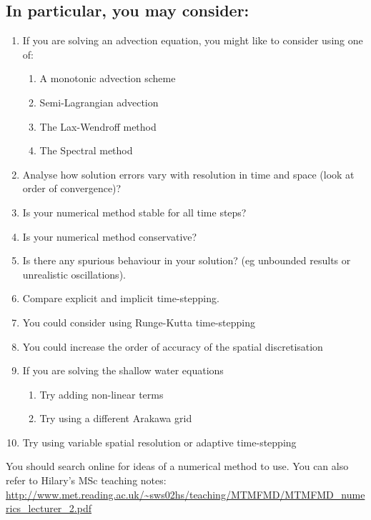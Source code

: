 \subsection*{In particular, you may consider:}
\begin{enumerate}
\item If you are solving an advection equation, you might like to consider
using one of:
\begin{enumerate}
\item A monotonic advection scheme
\item Semi-Lagrangian advection
\item The Lax-Wendroff method
\item The Spectral method
\end{enumerate}
\item Analyse how solution errors vary with resolution in time and space
(look at order of convergence)?
\item Is your numerical method stable for all time steps?
\item Is your numerical method conservative?
\item Is there any spurious behaviour in your solution? (eg unbounded results
or unrealistic oscillations).
\item Compare explicit and implicit time-stepping.
\item You could consider using Runge-Kutta time-stepping
\item You could increase the order of accuracy of the spatial discretisation
\item If you are solving the shallow water equations
\begin{enumerate}
\item Try adding non-linear terms
\item Try using a different Arakawa grid
\end{enumerate}
\item Try using variable spatial resolution or adaptive time-stepping
\end{enumerate}
You should search online for ideas of a numerical method to use. You
can also refer to Hilary's MSc teaching notes:\\
{\small{} \url{http://www.met.reading.ac.uk/~sws02hs/teaching/MTMFMD/MTMFMD_numerics_lecturer_2.pdf}}{\small\par}
